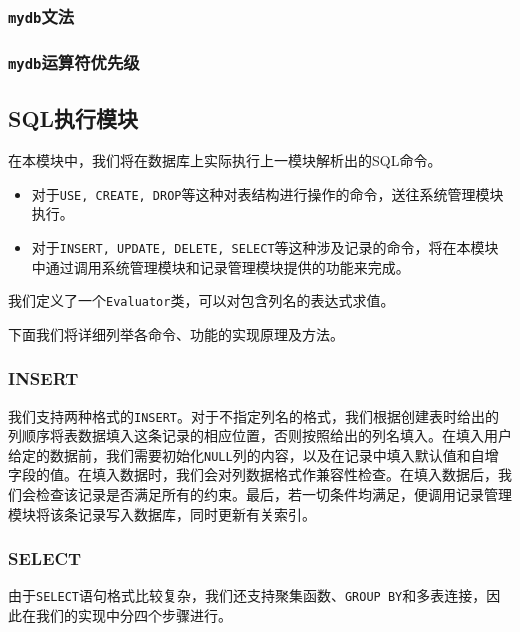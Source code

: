 \documentclass[11pt, a4paper]{article}
\begin{document}


\subsubsection{\texttt{mydb}文法}



\subsubsection{\texttt{mydb}运算符优先级}



\subsection{SQL执行模块}

在本模块中，我们将在数据库上实际执行上一模块解析出的SQL命令。

\begin{itemize}
\item 对于\texttt{USE, CREATE, DROP}等这种对表结构进行操作的命令，送往系统管理模块执行。
\item 对于\texttt{INSERT, UPDATE, DELETE, SELECT}等这种涉及记录的命令，将在本模块中通过调用系统管理模块和记录管理模块提供的功能来完成。
\end{itemize}

我们定义了一个\texttt{Evaluator}类，可以对包含列名的表达式求值。

下面我们将详细列举各命令、功能的实现原理及方法。

\subsubsection{INSERT}\label{sec:insert}

我们支持两种格式的\texttt{INSERT}。对于不指定列名的格式，我们根据创建表时给出的列顺序将表数据填入这条记录的相应位置，否则按照给出的列名填入。在填入用户给定的数据前，我们需要初始化\texttt{NULL}列的内容，以及在记录中填入默认值和自增字段的值。在填入数据时，我们会对列数据格式作兼容性检查。在填入数据后，我们会检查该记录是否满足所有的约束。最后，若一切条件均满足，便调用记录管理模块将该条记录写入数据库，同时更新有关索引。

\subsubsection{SELECT}\label{sec:select}

由于\texttt{SELECT}语句格式比较复杂，我们还支持聚集函数、\texttt{GROUP BY}和多表连接，因此在我们的实现中分四个步骤进行。
\end{document}
